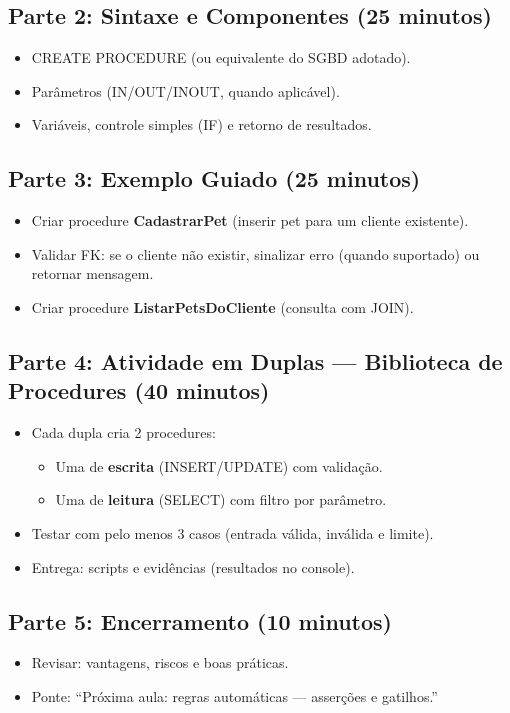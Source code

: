 \documentclass[12pt,a4paper]{article}
\begin{document}
\subsection*{Parte 2: Sintaxe e Componentes (25 minutos)}
\begin{itemize}[leftmargin=*,itemsep=0.35em]
  \item CREATE PROCEDURE (ou equivalente do SGBD adotado).
  \item Parâmetros (IN/OUT/INOUT, quando aplicável).
  \item Variáveis, controle simples (IF) e retorno de resultados.
\end{itemize}

\subsection*{Parte 3: Exemplo Guiado (25 minutos)}
\begin{itemize}[leftmargin=*,itemsep=0.35em]
  \item Criar procedure \textbf{CadastrarPet} (inserir pet para um cliente existente).
  \item Validar FK: se o cliente não existir, sinalizar erro (quando suportado) ou retornar mensagem.
  \item Criar procedure \textbf{ListarPetsDoCliente} (consulta com JOIN).
\end{itemize}

\subsection*{Parte 4: Atividade em Duplas --- Biblioteca de Procedures (40 minutos)}
\begin{itemize}[leftmargin=*,itemsep=0.35em]
  \item Cada dupla cria 2 procedures:
  \begin{itemize}[leftmargin=*,itemsep=0.25em]
    \item Uma de \textbf{escrita} (INSERT/UPDATE) com validação.
    \item Uma de \textbf{leitura} (SELECT) com filtro por parâmetro.
  \end{itemize}
  \item Testar com pelo menos 3 casos (entrada válida, inválida e limite).
  \item Entrega: scripts e evidências (resultados no console).
\end{itemize}

\subsection*{Parte 5: Encerramento (10 minutos)}
\begin{itemize}[leftmargin=*,itemsep=0.35em]
  \item Revisar: vantagens, riscos e boas práticas.
  \item Ponte: ``Próxima aula: regras automáticas --- asserções e gatilhos.''
\end{itemize}
\end{document}
